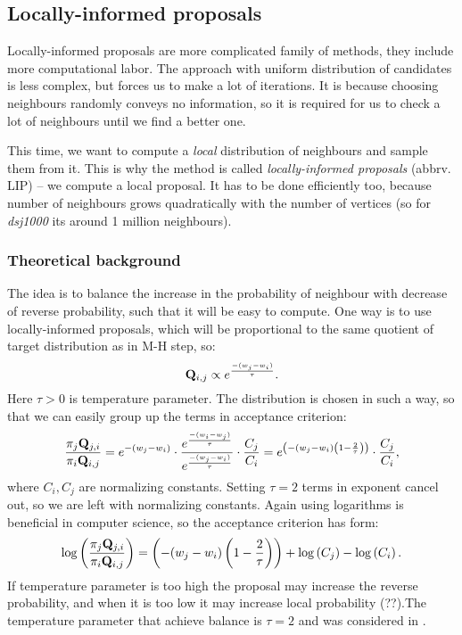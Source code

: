 \subsection{Locally-informed proposals}
	Locally-informed proposals are more complicated family of methods, they include more computational labor. The approach with uniform distribution of candidates is less complex, but forces us to make a lot of iterations. It is because choosing neighbours randomly conveys no information, so it is required for us to check a lot of neighbours until we find a better one. 
	
	This time, we want to compute a \textit{local} distribution of neighbours and sample them from it. This is why the method is called \textit{locally-informed proposals} (abbrv. LIP) -- we compute a local proposal. It has to be done efficiently too, because number of neighbours grows quadratically with the number of vertices (so for \textit{dsj1000} its around 1 million neighbours).
	
	\subsubsection{Theoretical background}
		The idea is to balance the increase in the probability of neighbour with decrease of reverse probability, such that it will be easy to compute. One way is to use locally-informed proposals, which will be proportional to the same quotient of target distribution as in M-H step, so:
		\begin{equation*}
			\mathbf{Q}_{i,j} \propto e^\frac{-(w_{j} - w_i)}{\tau}.
		\end{equation*}
		Here $\tau>0$ is temperature parameter. The distribution is chosen in such a way, so that we can easily group up the terms in acceptance criterion:
		\begin{equation*}
			\frac{\pi_j \mathbf{Q}_{j,i}}{\pi_i \mathbf{Q}_{i,j}} = e^{-(w_j-w_i)} \cdot \frac{e^\frac{-(w_{i} - w_j)}{\tau}}{e^\frac{-(w_{j} - w_i)}{\tau}} \cdot \frac{C_j}{C_i} = e^{\left( -(w_j-w_i) \left(1 - \frac{2}{\tau}\right) \right)} \cdot \frac{C_j}{C_i},
		\end{equation*}
		where $C_i, C_j$ are normalizing constants. Setting $\tau=2$ terms in exponent cancel out, so we are left with normalizing constants. Again using logarithms is beneficial in computer science, so the acceptance criterion has form:
		\begin{equation*}
			\log\left(\frac{\pi_j \mathbf{Q}_{j,i}}{\pi_i \mathbf{Q}_{i,j}}\right) = \left( -(w_j-w_i) \left(1 - \frac{2}{\tau}\right) \right) + \log\left(C_j\right) - \log\left(C_i\right).
		\end{equation*}
		If temperature parameter is too high the proposal may increase the reverse probability, and when it is too low it may increase local probability (??).The temperature parameter that achieve balance is $\tau=2$ and was considered in \cite{zanella2020informed}.
	
